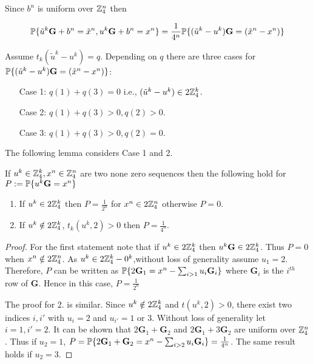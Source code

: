 Since $b^n$ is uniform over $\mathbb{Z}_4^n$ then 

\begin{align} \label{equ: p_u}
\mathbb{P}\{ \tilde{u}^k\mathbf{G}+b^n=\tilde{x}^n, u^k \mathbf{G}+b^n=x^n\}=\frac{1}{4^n}\mathbb{P}\{ (\tilde{u}^k-u^k)\mathbf{G}=(\tilde{x}^n-x^n)\}
\end{align}

Assume $t_k(\tilde{u}^k-u^k)=q$. Depending on $q$ there are three cases for  $\mathbb{P}\{ (\tilde{u}^k-u^k)\mathbf{G}=(\tilde{x}^n-x^n)\}$:

\begin{enumerate}
\item[Case 1:] $q(1)+q(3)=0$ i.e., $(\tilde{u}^k-u^k)\in 2\mathbb{Z}_4^k$.
\item[Case 2:] $q(1)+q(3)>0, q(2)>0$.
\item[Case 3:] $q(1)+q(3)>0, q(2)=0$.
\end{enumerate}

 The following lemma considers Case 1 and 2. 
\begin{lem}\label{lem: p_u}
 If $u^k \in \mathbb{Z}_4^k, x^n\in \mathbb{Z}_4^n$ are two none zero sequences then the following hold for  $P:=\mathbb{P}\{ u^k\mathbf{G}=x^n\}$
\begin{enumerate}
\item If $u^k\in 2 \mathbb{Z}_4^k$ then $P=\frac{1}{2^n}$ for $x^n \in 2 \mathbb{Z}_4^n$ otherwise $P=0$.
\item If  $u^k \notin 2 \mathbb{Z}_4^k$,  $t_k(u^k, 2)>0$ then  $P=\frac{1}{4^n}$.
\end{enumerate}
\end{lem}

\begin{proof}
For the first statement note that if $u^k\in 2 \mathbb{Z}_4^k$ then $ u^k\mathbf{G}\in 2 \mathbb{Z}_4^k$. Thus $P=0$ when $x^n \notin 2 \mathbb{Z}_4^n$. As $u^k\in 2\mathbb{Z}_4^k-0^k$,without loss of generality assume $u_1=2$. Therefore, $P$ can be written as $\mathbb{P}\{ 2\mathbf{G}_1=x^n-\sum_{i>1} u_i \mathbf{G}_i\}$ where $\mathbf{G}_i$ is the $i^{th}$ row of $\mathbf{G}$. Hence in this case, $P=\frac{1}{2^n}$


The proof for 2. is similar. Since $u^k \notin 2 \mathbb{Z}_4^k$ and $t(u^k, 2)>0$, there exist two indices $i,i'$ with $u_{i}=2$ and $u_{i'}=1$ or $3$. Without loss of generality let $i=1, i'=2$. It can be shown that $2\mathbf{G}_1+\mathbf{G}_2$ and $2\mathbf{G}_1+3\mathbf{G}_2$ are uniform over $\mathbb{Z}_4^n$. Thus if $u_2=1$,  $P=\mathbb{P}\{ 2\mathbf{G}_1+\mathbf{G}_2=x^n-\sum_{i>2} u_i \mathbf{G}_i\}=\frac{1}{4^n}$. The same result holds if $u_2=3$.
\end{proof}

